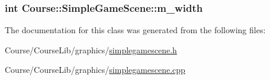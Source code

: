 \hypertarget{classCourse_1_1SimpleGameScene_a092cd06906c5f7bf90932155cce61c65}{
\subsubsection[{m\-\_\-width}]{\setlength{\rightskip}{0pt plus 5cm}int Course\-::\-Simple\-Game\-Scene\-::m\-\_\-width\hspace{0.3cm}{\ttfamily [private]}}}\label{classCourse_1_1SimpleGameScene_a092cd06906c5f7bf90932155cce61c65}


The documentation for this class was generated from the following files\-:\begin{DoxyCompactItemize}
\item 
Course/\-Course\-Lib/graphics/\hyperlink{simplegamescene_8h}{simplegamescene.\-h}\item 
Course/\-Course\-Lib/graphics/\hyperlink{simplegamescene_8cpp}{simplegamescene.\-cpp}\end{DoxyCompactItemize}
